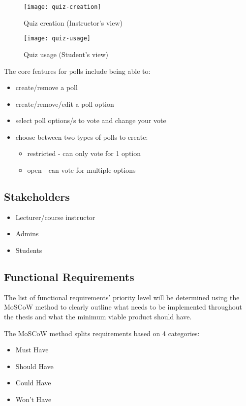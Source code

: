 \begin{figure}[h!]
\centering
\texttt{[image: quiz-creation]}
\caption{Quiz creation (Instructor's view)}
\end{figure}

\begin{figure}[h!]
\centering
\texttt{[image: quiz-usage]}
\caption{Quiz usage (Student's view)}
\end{figure}

The core features for polls include being able to:
\begin{itemize}
	\item create/remove a poll
	\item create/remove/edit a poll option
	\item select poll options/s to vote and change your vote
	\item choose between two types of polls to create:
		\begin{itemize}
			\item restricted - can only vote for 1 option
			\item open - can vote for multiple options
		\end{itemize}
\end{itemize}


\subsection{Stakeholders}
\begin{itemize}
	\item Lecturer/course instructor
	\item Admins
	\item Students
\end{itemize}

\subsection{Functional Requirements}
The list of functional requirements' priority level will be determined using the MoSCoW method to clearly outline what needs to be implemented throughout the thesis and what the minimum viable product should have. 

The MoSCoW method splits requirements based on 4 categories:
\begin{itemize}
	\item Must Have
	\item Should Have
	\item Could Have
	\item Won't Have
\end{itemize}

